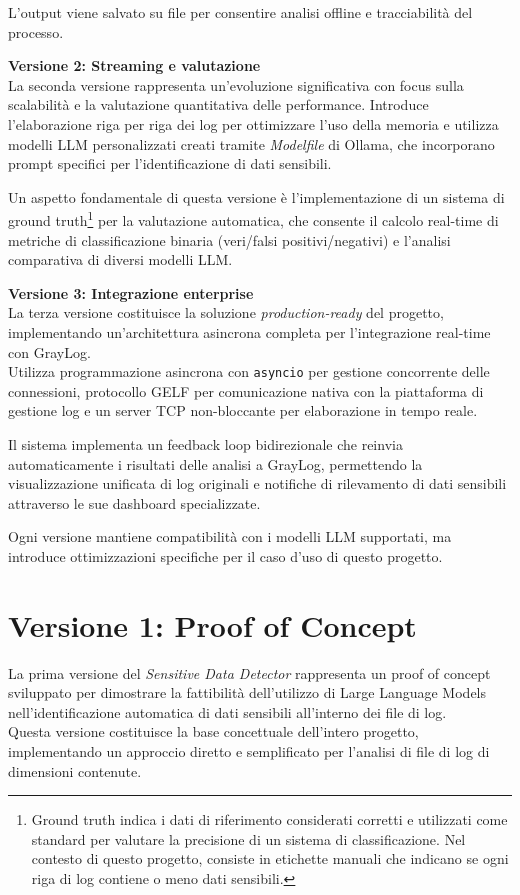 \documentclass[12pt]{report}
\begin{document}
L'output viene salvato su file per consentire analisi offline e tracciabilità del processo.

\textbf{Versione 2: Streaming e valutazione} \\
La seconda versione rappresenta un'evoluzione significativa con focus sulla scalabilità e la valutazione quantitativa delle performance. Introduce l'elaborazione riga per riga dei log per ottimizzare l'uso della memoria e utilizza modelli LLM personalizzati creati tramite \textit{Modelfile} di Ollama, che incorporano prompt specifici per l'identificazione di dati sensibili.

Un aspetto fondamentale di questa versione è l'implementazione di un sistema di ground truth\footnote{Ground truth indica i dati di riferimento considerati corretti e utilizzati come standard per valutare la precisione di un sistema di classificazione. Nel contesto di questo progetto, consiste in etichette manuali che indicano se ogni riga di log contiene o meno dati sensibili.} per la valutazione automatica, che consente il calcolo real-time di metriche di classificazione binaria (veri/falsi positivi/negativi) e l'analisi comparativa di diversi modelli LLM.

\textbf{Versione 3: Integrazione enterprise} \\
La terza versione costituisce la soluzione \textit{production-ready} del progetto, implementando un'architettura asincrona completa per l'integrazione real-time con GrayLog. \\
Utilizza programmazione asincrona con \texttt{asyncio} per gestione concorrente delle connessioni, protocollo GELF per comunicazione nativa con la piattaforma di gestione log e un server TCP non-bloccante per elaborazione in tempo reale.

Il sistema implementa un feedback loop bidirezionale che reinvia automaticamente i risultati delle analisi a GrayLog, permettendo la visualizzazione unificata di log originali e notifiche di rilevamento di dati sensibili attraverso le sue dashboard specializzate.

Ogni versione mantiene compatibilità con i modelli LLM supportati, ma introduce ottimizzazioni specifiche per il caso d'uso di questo progetto.

\section{Versione 1: Proof of Concept}
\label{sec:ver1}

La prima versione del \textit{Sensitive Data Detector} rappresenta un proof of concept sviluppato per dimostrare la fattibilità dell'utilizzo di Large Language Models nell'identificazione automatica di dati sensibili all'interno dei file di log. \\
Questa versione costituisce la base concettuale dell'intero progetto, implementando un approccio diretto e semplificato per l'analisi di file di log di dimensioni contenute.
\end{document}
